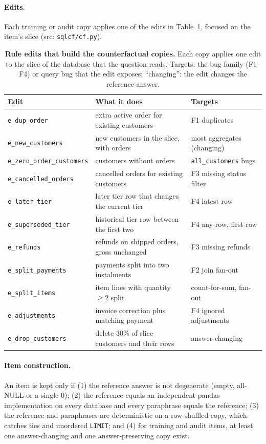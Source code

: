 \documentclass{article}
\begin{document}
\paragraph{Edits.}
Each training or audit copy applies one of the edits in Table~\ref{tab:edits}, focused on the item's slice (src: \texttt{sqlcf/cf.py}).
\begin{table}[ht]
\caption{\textbf{Rule edits that build the counterfactual copies.} Each copy applies one edit to the slice of the database that the question reads. Targets: the bug family (F1--F4) or query bug that the edit exposes; ``changing'': the edit changes the reference answer.}
\label{tab:edits}
\centering\small\setlength{\tabcolsep}{4pt}
\begin{tabular}{lll}
\toprule
Edit & What it does & Targets \\
\midrule
\texttt{e\_dup\_order} & extra active order for existing customers & F1 duplicates \\
\texttt{e\_new\_customers} & new customers in the slice, with orders & most aggregates (changing) \\
\texttt{e\_zero\_order\_customers} & customers without orders & \texttt{all\_customers} bugs \\
\texttt{e\_cancelled\_orders} & cancelled orders for existing customers & F3 missing status filter \\
\texttt{e\_later\_tier} & later tier row that changes the current tier & F4 latest row \\
\texttt{e\_superseded\_tier} & historical tier row between the first two & F4 any-row, first-row \\
\texttt{e\_refunds} & refunds on shipped orders, gross unchanged & F3 missing refunds \\
\texttt{e\_split\_payments} & payments split into two instalments & F2 join fan-out \\
\texttt{e\_split\_items} & item lines with quantity $\geq 2$ split & count-for-sum, fan-out \\
\texttt{e\_adjustments} & invoice correction plus matching payment & F4 ignored adjustments \\
\texttt{e\_drop\_customers} & delete 30\% of slice customers and their rows & answer-changing \\
\bottomrule
\end{tabular}
\end{table}

\paragraph{Item construction.}
An item is kept only if (1) the reference answer is not degenerate (empty, all-NULL or a single 0); (2) the reference equals an independent pandas implementation on every database and every paraphrase equals the reference; (3) the reference and paraphrases are deterministic on a row-shuffled copy, which catches ties and unordered \texttt{LIMIT}; and (4) for training and audit items, at least one answer-changing and one answer-preserving copy exist.
\end{document}
